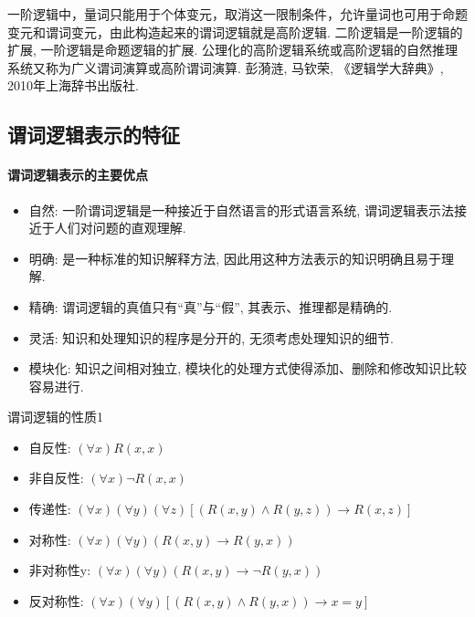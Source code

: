 \begin{remark}
      一阶逻辑中，量词只能用于个体变元，取消这一限制条件，允许量词也可用于命题变元和谓词变元，由此构造起来的谓词逻辑就是高阶逻辑. 二阶逻辑是一阶逻辑的扩展, 一阶逻辑是命题逻辑的扩展. 公理化的高阶逻辑系统或高阶逻辑的自然推理系统又称为广义谓词演算或高阶谓词演算. 彭漪涟, 马钦荣, 《逻辑学大辞典》, 2010年上海辞书出版社.
\end{remark}

\subsection{谓词逻辑表示的特征}
\paragraph{谓词逻辑表示的主要优点}
\begin{itemize}
\item 自然: 一阶谓词逻辑是一种接近于自然语言的形式语言系统, 谓词逻辑表示法接近于人们对问题的直观理解.
\item 明确: 是一种标准的知识解释方法, 因此用这种方法表示的知识明确且易于理解.
\item 精确: 谓词逻辑的真值只有“真”与“假”, 其表示、推理都是精确的.
\item 灵活: 知识和处理知识的程序是分开的, 无须考虑处理知识的细节.
\item 模块化: 知识之间相对独立, 模块化的处理方式使得添加、删除和修改知识比较容易进行.
\end{itemize}
\begin{myprop}{谓词逻辑的性质}{1}
\begin{itemize}
\item 自反性: $(\forall x)  R(x, x)$
\item 非自反性: $(\forall x)  \neg R(x, x)$
\item 传递性: $(\forall x) (\forall y) (\forall z)  [(R(x, y) \wedge R(y, z)) \rightarrow R(x, z)]$
\item  对称性: $(\forall x) (\forall y)  (R(x, y) \rightarrow R(y, x))$
\item 非对称性y: $(\forall x) (\forall y)  (R(x, y) \rightarrow \neg R(y, x))$
\item 反对称性: $(\forall x) (\forall y)  [(R(x, y) \wedge R(y, x)) \rightarrow x = y]$
\end{itemize}
\end{myprop}

